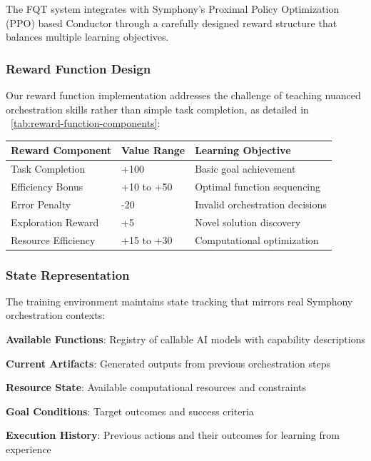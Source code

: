 The FQT system integrates with Symphony's Proximal Policy Optimization (PPO) based Conductor through a carefully designed reward structure that balances multiple learning objectives.

\subsubsection*{Reward Function Design}

Our reward function implementation addresses the challenge of teaching nuanced orchestration skills rather than simple task completion, as detailed in ~\ref{tab:reward-function-components}:

\begin{center}
\begin{tabular}{@{}lll@{}}
\toprule
\textbf{Reward Component} & \textbf{Value Range} & \textbf{Learning Objective} \\
\midrule
Task Completion & +100 & Basic goal achievement \\
Efficiency Bonus & +10 to +50 & Optimal function sequencing \\
Error Penalty & -20 & Invalid orchestration decisions \\
Exploration Reward & +5 & Novel solution discovery \\
Resource Efficiency & +15 to +30 & Computational optimization \\
\bottomrule
\end{tabular}
\label{tab:reward-function-components}
\end{center}

\subsubsection*{State Representation}

The training environment maintains state tracking that mirrors real Symphony orchestration contexts:

\begin{compactlist}
    \item \textbf{Available Functions}: Registry of callable AI models with capability descriptions
    \item \textbf{Current Artifacts}: Generated outputs from previous orchestration steps
    \item \textbf{Resource State}: Available computational resources and constraints
    \item \textbf{Goal Conditions}: Target outcomes and success criteria
    \item \textbf{Execution History}: Previous actions and their outcomes for learning from experience
\end{compactlist}

